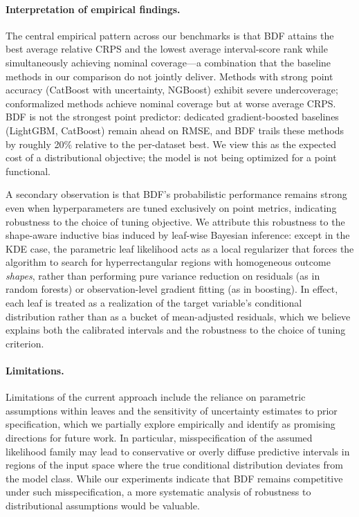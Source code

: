\documentclass[twoside,11pt]{article}
\begin{document}
\paragraph{Interpretation of empirical findings.}
The central empirical pattern across our benchmarks is that BDF attains the best average relative CRPS and the lowest average interval-score rank while simultaneously achieving nominal coverage---a combination that the baseline methods in our comparison do not jointly deliver. Methods with strong point accuracy (CatBoost with uncertainty, NGBoost) exhibit severe undercoverage; conformalized methods achieve nominal coverage but at worse average CRPS. BDF is not the strongest point predictor: dedicated gradient-boosted baselines (LightGBM, CatBoost) remain ahead on RMSE, and BDF trails these methods by roughly 20\% relative to the per-dataset best. We view this as the expected cost of a distributional objective; the model is not being optimized for a point functional.

A secondary observation is that BDF's probabilistic performance remains strong even when hyperparameters are tuned exclusively on point metrics, indicating robustness to the choice of tuning objective. We attribute this robustness to the shape-aware inductive bias induced by leaf-wise Bayesian inference: except in the KDE case, the parametric leaf likelihood acts as a local regularizer that forces the algorithm to search for hyperrectangular regions with homogeneous outcome \emph{shapes}, rather than performing pure variance reduction on residuals (as in random forests) or observation-level gradient fitting (as in boosting). In effect, each leaf is treated as a realization of the target variable's conditional distribution rather than as a bucket of mean-adjusted residuals, which we believe explains both the calibrated intervals and the robustness to the choice of tuning criterion.

\paragraph{Limitations.}
Limitations of the current approach include the reliance on parametric assumptions within leaves and the sensitivity of uncertainty estimates to prior specification, which we partially explore empirically and identify as promising directions for future work. In particular, misspecification of the assumed likelihood family may lead to conservative or overly diffuse predictive intervals in regions of the input space where the true conditional distribution deviates from the model class. While our experiments indicate that BDF remains competitive under such misspecification, a more systematic analysis of robustness to distributional assumptions would be valuable.
\end{document}
